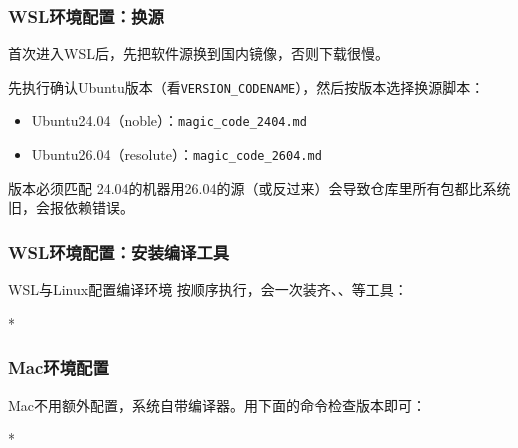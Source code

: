 \begin{frame}
    \frametitle{WSL环境配置：换源}
    首次进入WSL后，先把软件源换到国内镜像，否则下载很慢。

    先执行确认Ubuntu版本（看\texttt{VERSION\_CODENAME}），然后按版本选择换源脚本：
    \begin{itemize}
        \item Ubuntu24.04（noble）：\texttt{magic\_code\_2404.md}
        \item Ubuntu26.04（resolute）：\texttt{magic\_code\_2604.md}
    \end{itemize}

    \begin{vspquotered}{版本必须匹配}
        24.04的机器用26.04的源（或反过来）会导致仓库里所有包都比系统旧，会报依赖错误。
    \end{vspquotered}
\end{frame}

\begin{frame}
    \frametitle{WSL环境配置：安装编译工具}
    \begin{vspquote}{WSL与Linux配置编译环境}
        按顺序执行，会一次装齐、、等工具：
        \begin{Code}*
            
        \end{Code}
    \end{vspquote}
\end{frame}

\begin{frame}
    \frametitle{Mac环境配置}
    Mac不用额外配置，系统自带编译器。用下面的命令检查版本即可：
    \begin{Code}*
        
    \end{Code}
\end{frame}

